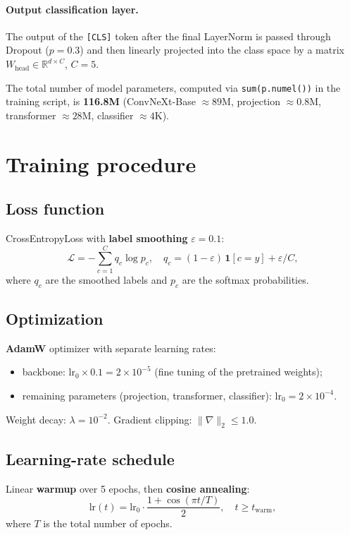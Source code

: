 \documentclass[14pt,a4paper]{extreport}
\begin{document}
\paragraph{Output classification layer.} The output of the
\texttt{[CLS]} token after the final LayerNorm is passed through Dropout
($p=0.3$) and then linearly projected into the class space by a matrix
$W_{\text{head}} \in \mathbb{R}^{d \times C}$, $C = 5$.

The total number of model parameters, computed via
\texttt{sum(p.numel())} in the training script, is \textbf{116.8M}
(ConvNeXt-Base $\approx 89$M, projection $\approx 0.8$M, transformer
$\approx 28$M, classifier $\approx 4$K).

\section{Training procedure}

\subsection{Loss function}

CrossEntropyLoss with \textbf{label smoothing} $\varepsilon=0.1$:
\[
    \mathcal{L} = -\sum_{c=1}^{C} q_c \log p_c,
    \quad
    q_c = (1-\varepsilon)\,\mathbf{1}[c=y] + \varepsilon / C,
\]
where $q_c$ are the smoothed labels and $p_c$ are the softmax
probabilities.

\subsection{Optimization}

\textbf{AdamW} optimizer with separate learning rates:
\begin{itemize}
    \item backbone: $\text{lr}_0 \times 0.1 = 2 \times 10^{-5}$ (fine
          tuning of the pretrained weights);
    \item remaining parameters (projection, transformer, classifier):
          $\text{lr}_0 = 2 \times 10^{-4}$.
\end{itemize}
Weight decay: $\lambda = 10^{-2}$. Gradient clipping: $\|\nabla\|_2 \le 1.0$.

\subsection{Learning-rate schedule}

Linear \textbf{warmup} over 5 epochs, then \textbf{cosine annealing}:
\[
    \text{lr}(t) = \text{lr}_0 \cdot \frac{1 + \cos(\pi t/T)}{2},
    \quad t \ge t_\text{warm},
\]
where $T$ is the total number of epochs.
\end{document}
